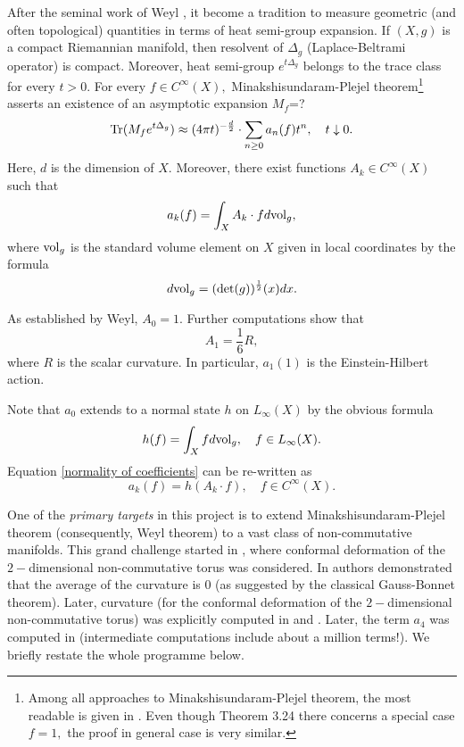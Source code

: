 \documentclass{article}
\begin{document}
After the seminal work of Weyl \cite{Weyl}, it become a tradition to measure geometric (and often topological) quantities in terms of heat semi-group expansion. If $(X,g)$ is a compact Riemannian manifold, then resolvent of $\Delta_g$ (Laplace-Beltrami operator) is compact. Moreover, heat semi-group $e^{t\Delta_g}$ belongs to the trace class for every $t>0.$ For every $f\in C^{\infty}(X),$ Minakshisundaram-Plejel theorem\footnote{Among all approaches to Minakshisundaram-Plejel theorem, the most readable is given in \cite{Rosenberg}. Even though Theorem 3.24 there concerns a special case $f=1,$ the proof in general case is very similar.} \cite{Rosenberg} asserts an existence of an asymptotic expansion {\color{blue}$M_f$=?}
\begin{equation}\label{heat asymptotic}
{\rm Tr}(M_fe^{t\Delta_g})\approx (4\pi t)^{-\frac{d}{2}}\cdot \sum_{n\geq0}a_n(f)t^n,\quad t\downarrow0.
\end{equation}
Here, $d$ is the dimension of $X.$ Moreover, there exist functions $A_k\in C^{\infty}(X)$ such that
\begin{equation}\label{normality of coefficients}
a_k(f)=\int_X A_k\cdot f d{\rm vol}_g,
\end{equation}
where ${\rm vol}_g$ is the standard volume element on $X$ given in local coordinates by the formula
$$d{\rm vol}_g=({\rm det}(g))^{\frac12}(x)dx.$$

As established by Weyl, $A_0=1.$ Further computations show that
$$A_1=\frac16 R,$$
where $R$ is the scalar curvature. In particular, $a_1(1)$ is the Einstein-Hilbert action.

Note that $a_0$ extends to a normal state $h$ on $L_{\infty}(X)$ by the obvious formula
$$h(f)=\int_X fd{\rm vol}_g,\quad f\in L_{\infty}(X).$$
Equation \eqref{normality of coefficients} can be re-written as
$$a_k(f)=h(A_k\cdot f),\quad f\in C^{\infty}(X).$$

One of the {\it primary targets} in this project is to extend Minakshisundaram-Plejel theorem (consequently, Weyl theorem) to a vast class of non-commutative manifolds. This grand challenge started in \cite{ConnesTretkoff}, where conformal deformation of the $2-$dimensional non-commutative torus was considered. In \cite{ConnesTretkoff} authors demonstrated that the average of the curvature is $0$ (as suggested by the classical Gauss-Bonnet theorem). Later, curvature (for the conformal deformation of the $2-$dimensional non-commutative torus) was explicitly computed in \cite{ConnesMoscovici_curvature} and \cite{FathizadehKhalkhali}. Later, the term $a_4$ was computed in \cite{ConnesFathizadeh} (intermediate computations include about a million terms!). We briefly restate the whole programme below.  
\end{document}
